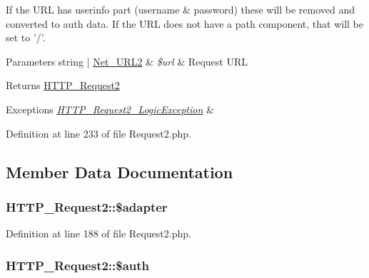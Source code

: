 If the U\-R\-L has userinfo part (username \& password) these will be removed and converted to auth data. If the U\-R\-L does not have a path component, that will be set to '/'.


\begin{DoxyParams}[1]{Parameters}
string | \hyperlink{classNet__URL2}{Net\-\_\-\-U\-R\-L2} & {\em \$url} & Request U\-R\-L\\
\hline
\end{DoxyParams}
\begin{DoxyReturn}{Returns}
\hyperlink{classHTTP__Request2}{H\-T\-T\-P\-\_\-\-Request2} 
\end{DoxyReturn}

\begin{DoxyExceptions}{Exceptions}
{\em \hyperlink{classHTTP__Request2__LogicException}{H\-T\-T\-P\-\_\-\-Request2\-\_\-\-Logic\-Exception}} & \\
\hline
\end{DoxyExceptions}


Definition at line 233 of file Request2.\-php.



\subsection{Member Data Documentation}
\hypertarget{classHTTP__Request2_a4de3f606051b53b314179271f9bd0173}{
\subsubsection[{\$adapter}]{\setlength{\rightskip}{0pt plus 5cm}H\-T\-T\-P\-\_\-\-Request2\-::\$adapter\hspace{0.3cm}{\ttfamily [protected]}}}\label{classHTTP__Request2_a4de3f606051b53b314179271f9bd0173}


Definition at line 188 of file Request2.\-php.

\hypertarget{classHTTP__Request2_a4c1219356a8c669730a1fe09bd8f81b1}{
\subsubsection[{\$auth}]{\setlength{\rightskip}{0pt plus 5cm}H\-T\-T\-P\-\_\-\-Request2\-::\$auth\hspace{0.3cm}{\ttfamily [protected]}}}\label{classHTTP__Request2_a4c1219356a8c669730a1fe09bd8f81b1}


